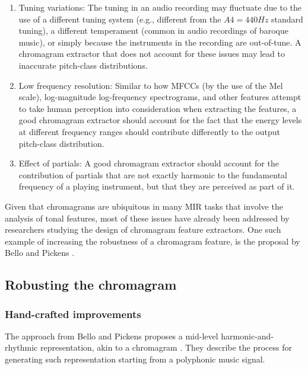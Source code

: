 \begin{enumerate}
    \item Tuning variations: The tuning in an audio recording may fluctuate due to the use of a different tuning system (e.g., different from the $A4=440Hz$ standard tuning), a different temperament (common in audio recordings of baroque music), or simply because the instruments in the recording are out-of-tune. A chromagram extractor that does not account for these issues may lead to inaccurate pitch-class distributions.
    \item Low frequency resolution: Similar to how MFCCs (by the use of the Mel scale), log-magnitude log-frequency spectrograms, and other features attempt to take human perception into consideration when extracting the features, a good chromagram extractor should account for the fact that the energy levels at different frequency ranges should contribute differently to the output pitch-class distribution.
    \item Effect of partials: A good chromagram extractor should account for the contribution of partials that are not exactly harmonic to the fundamental frequency of a playing instrument, but that they are perceived as part of it.
\end{enumerate}

Given that chromagrams are ubiquitous in many MIR tasks that involve the analysis of tonal features, most of these issues have already been addressed by researchers studying the design of chromagram feature extractors. One such example of increasing the robustness of a chromagram feature, is the proposal by Bello and Pickens \cite{bello2005robust}.

\subsection{Robusting the chromagram}

\subsubsection{Hand-crafted improvements}
The approach from Bello and Pickens proposes a mid-level harmonic-and-rhythmic representation, akin to a chromagram \cite{bello2005robust}. They describe the process for generating such representation starting from a polyphonic music signal.

